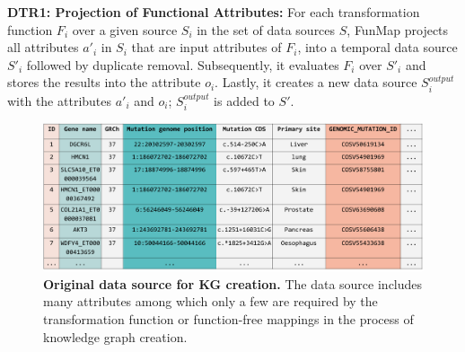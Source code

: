 \noindent\textbf{DTR1: Projection of Functional Attributes:}
For each transformation function $F_i$ over a given source $S_i$ in the set of data sources $S$, FunMap projects all attributes $a'_i$ in $S_i$ that are input attributes of $F_i$, into a temporal data source $S'_i$ followed by duplicate removal. Subsequently, it evaluates $F_i$ over $S'_i$ and stores the results into the attribute $o_i$. Lastly, it creates a new data source $S_{i}^{output}$ with the attributes $a'_i$ and $o_i$; $S_{i}^{output}$ is added to $S'$. 
\begin{figure}[t!]
\includegraphics[width=\textwidth]{figures/OriginalDatasource.png}
\caption{\textbf{Original data source for KG creation.} The data source includes many attributes among which only a few are required by the transformation function or function-free mappings in the process of knowledge graph creation.} 
\label{fig:OriginalDatasource}
\end{figure}
